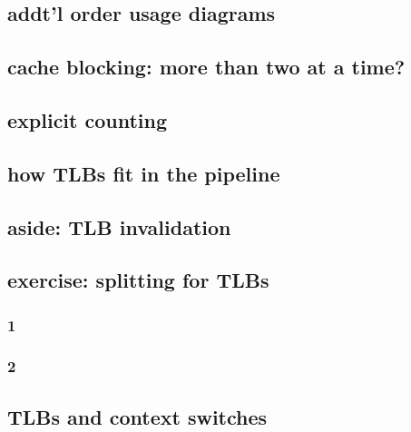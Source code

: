 \subsection{addt'l order usage diagrams}

\subsection{cache blocking: more than two at a time?}

%


\subsection{explicit counting}


\subsection{how TLBs fit in the pipeline}


\subsection{aside: TLB invalidation}


\subsection{exercise: splitting for TLBs}
\subsubsection{1}

\subsubsection{2}




\subsection{TLBs and context switches}



